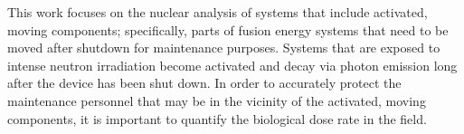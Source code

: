 This work focuses on the nuclear analysis of systems that include activated, moving
components; specifically, parts of fusion energy systems that need to be moved
after shutdown for maintenance purposes.  
Systems that are exposed to intense
neutron irradiation become activated and decay via photon emission long after the
device has been shut down.  In order to accurately protect the maintenance
personnel that may be in the vicinity of the activated, moving components, it is
important to quantify the biological dose rate in the field.











